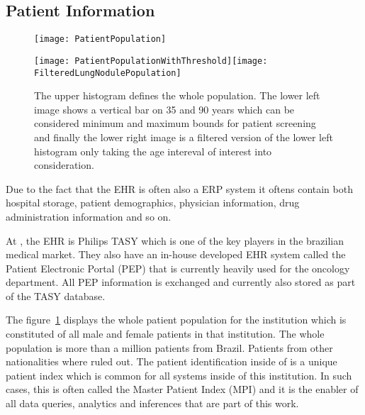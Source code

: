 \subsection{Patient Information}

\label{sec:ehr_patient_information}
\begin{center}
\begin{figure}
\begin{centering}
\texttt{[image: PatientPopulation]}
\par\end{centering}
\begin{centering}
\texttt{[image: PatientPopulationWithThreshold]}\texttt{[image: FilteredLungNodulePopulation]}
\end{centering}
\caption{\label{fig:patient_population}The upper histogram defines the whole \nomeHsl{} population. The lower left image shows a vertical bar on 35 and 90 years which can
be considered minimum and maximum bounds for patient screening and
finally the lower right image is a filtered version of the lower left
histogram only taking the age intereval of interest into consideration.}
\end{figure}
\vspace*{-38pt}
\end{center}

Due to the fact that the EHR is often also a ERP system it oftens contain both hospital storage, patient demographics, physician information, drug administration information and so on. 

At \nomeHsl{}, the EHR is Philips TASY which is one of the key players in the brazilian medical market. They also have an in-house developed EHR system called the Patient Electronic Portal (PEP) that is currently heavily used for the oncology department. All PEP information is exchanged and currently also stored as part of the TASY database.

The figure~\ref{fig:patient_population} displays the whole patient population for the institution which is constituted of all male and female patients in that institution. The whole population is more than a million patients from Brazil. Patients from other nationalities where ruled out. The patient identification inside of \nomeHslShort{} is a unique patient index which is common for all systems inside of this institution. In such cases, this is often called the Master Patient Index (MPI) and it is the enabler of all data queries, analytics and inferences that are part of this work.

